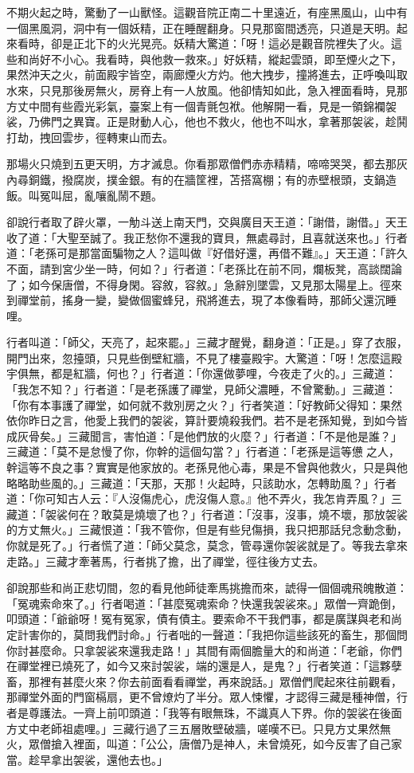 不期火起之時，驚動了一山獸怪。這觀音院正南二十里遠近，有座黑風山，山中有一個黑風洞，洞中有一個妖精，正在睡醒翻身。只見那窗間透亮，只道是天明。起來看時，卻是正北下的火光晃亮。妖精大驚道：「呀！這必是觀音院裡失了火。這些和尚好不小心。我看時，與他救一救來。」好妖精，縱起雲頭，即至煙火之下，果然沖天之火，前面殿宇皆空，兩廊煙火方灼。他大拽步，撞將進去，正呼喚叫取水來，只見那後房無火，房脊上有一人放風。他卻情知如此，急入裡面看時，見那方丈中間有些霞光彩氣，臺案上有一個青氈包袱。他解開一看，見是一領錦襴袈裟，乃佛門之異寶。正是財動人心，他也不救火，他也不叫水，拿著那袈裟，趁鬨打劫，拽回雲步，徑轉東山而去。

那場火只燒到五更天明，方才滅息。你看那眾僧們赤赤精精，啼啼哭哭，都去那灰內尋銅鐵，撥腐炭，撲金銀。有的在牆筐裡，苫搭窩棚；有的赤壁根頭，支鍋造飯。叫冤叫屈，亂嚷亂鬧不題。

卻說行者取了辟火罩，一觔斗送上南天門，交與廣目天王道：「謝借，謝借。」天王收了道：「大聖至誠了。我正愁你不還我的寶貝，無處尋討，且喜就送來也。」行者道：「老孫可是那當面騙物之人？這叫做『好借好還，再借不難』。」天王道：「許久不面，請到宮少坐一時，何如？」行者道：「老孫比在前不同，爛板凳，高談闊論了；如今保唐僧，不得身閑。容敘，容敘。」急辭別墜雲，又見那太陽星上。徑來到禪堂前，搖身一變，變做個蜜蜂兒，飛將進去，現了本像看時，那師父還沉睡哩。

行者叫道：「師父，天亮了，起來罷。」三藏才醒覺，翻身道：「正是。」穿了衣服，開門出來，忽擡頭，只見些倒壁紅牆，不見了樓臺殿宇。大驚道：「呀！怎麼這殿宇俱無，都是紅牆，何也？」行者道：「你還做夢哩，今夜走了火的。」三藏道：「我怎不知？」行者道：「是老孫護了禪堂，見師父濃睡，不曾驚動。」三藏道：「你有本事護了禪堂，如何就不救別房之火？」行者笑道：「好教師父得知：果然依你昨日之言，他愛上我們的袈裟，算計要燒殺我們。若不是老孫知覺，到如今皆成灰骨矣。」三藏聞言，害怕道：「是他們放的火麼？」行者道：「不是他是誰？」三藏道：「莫不是怠慢了你，你幹的這個勾當？」行者道：「老孫是這等憊𪬯之人，幹這等不良之事？實實是他家放的。老孫見他心毒，果是不曾與他救火，只是與他略略助些風的。」三藏道：「天那，天那！火起時，只該助水，怎轉助風？」行者道：「你可知古人云：『人沒傷虎心，虎沒傷人意。』他不弄火，我怎肯弄風？」三藏道：「袈裟何在？敢莫是燒壞了也？」行者道：「沒事，沒事，燒不壞，那放袈裟的方丈無火。」三藏恨道：「我不管你，但是有些兒傷損，我只把那話兒念動念動，你就是死了。」行者慌了道：「師父莫念，莫念，管尋還你袈裟就是了。等我去拿來走路。」三藏才牽著馬，行者挑了擔，出了禪堂，徑往後方丈去。

卻說那些和尚正悲切間，忽的看見他師徒牽馬挑擔而來，諕得一個個魂飛魄散道：「冤魂索命來了。」行者喝道：「甚麼冤魂索命？快還我袈裟來。」眾僧一齊跪倒，叩頭道：「爺爺呀！冤有冤家，債有債主。要索命不干我們事，都是廣謀與老和尚定計害你的，莫問我們討命。」行者咄的一聲道：「我把你這些該死的畜生，那個問你討甚麼命。只拿袈裟來還我走路！」其間有兩個膽量大的和尚道：「老爺，你們在禪堂裡已燒死了，如今又來討袈裟，端的還是人，是鬼？」行者笑道：「這夥孽畜，那裡有甚麼火來？你去前面看看禪堂，再來說話。」眾僧們爬起來往前觀看，那禪堂外面的門窗槅扇，更不曾燎灼了半分。眾人悚懼，才認得三藏是種神僧，行者是尊護法。一齊上前叩頭道：「我等有眼無珠，不識真人下界。你的袈裟在後面方丈中老師祖處哩。」三藏行過了三五層敗壁破牆，嗟嘆不已。只見方丈果然無火，眾僧搶入裡面，叫道：「公公，唐僧乃是神人，未曾燒死，如今反害了自己家當。趁早拿出袈裟，還他去也。」

